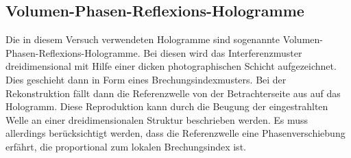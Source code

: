 \documentclass[german,  %
parskip=full,  %
]{scrartcl}
\begin{document}
\subsection{Volumen-Phasen-Reflexions-Hologramme}
Die in diesem Versuch verwendeten Hologramme sind sogenannte Volumen-Phasen-Reflexions-Hologramme. Bei diesen wird das Interferenzmuster dreidimensional mit Hilfe einer dicken photographischen Schicht aufgezeichnet. Dies geschieht dann in Form eines Brechungsindexmusters. 
\newline
Bei der Rekonstruktion fällt dann die Referenzwelle von der Betrachterseite aus auf das Hologramm. Diese Reproduktion kann durch die Beugung der eingestrahlten Welle an einer dreidimensionalen Struktur beschrieben werden. Es muss allerdings berücksichtigt werden, dass die Referenzwelle eine Phasenverschiebung erfährt, die proportional zum lokalen Brechungsindex ist.
\end{document}
